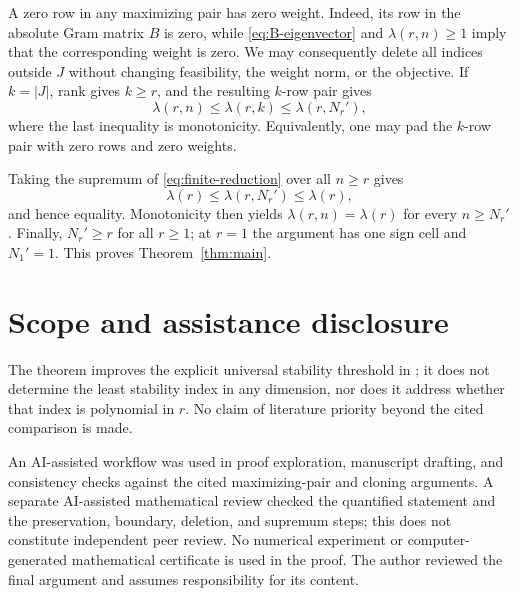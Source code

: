 \documentclass[11pt]{article}
\begin{document}
A zero row in any maximizing pair has zero weight.  Indeed, its row in the
absolute Gram matrix $B$ is zero, while
\eqref{eq:B-eigenvector} and $\lambda(r,n)\ge1$ imply that the corresponding
weight is zero.  We may consequently delete all indices outside $J$ without
changing feasibility, the weight norm, or the objective.  If $k=|J|$, rank
gives $k\ge r$, and the resulting $k$-row pair gives
\begin{equation}\label{eq:finite-reduction}
 \lambda(r,n)\le\lambda(r,k)\le\lambda(r,N_r'),
\end{equation}
where the last inequality is monotonicity.  Equivalently, one may pad the
$k$-row pair with zero rows and zero weights.

Taking the supremum of \eqref{eq:finite-reduction} over all $n\ge r$ gives
\[
 \lambda(r)\le\lambda(r,N_r')\le\lambda(r),
\]
and hence equality.  Monotonicity then yields
$\lambda(r,n)=\lambda(r)$ for every $n\ge N_r'$.  Finally,
$N_r'\ge r$ for all $r\ge1$; at $r=1$ the argument has one sign cell and
$N_1'=1$.  This proves Theorem~\ref{thm:main}.

\section*{Scope and assistance disclosure}

The theorem improves the explicit universal stability threshold in
\cite{KumarEtAl2026}; it does not determine the least stability index in any
dimension, nor does it address whether that index is polynomial in $r$.
No claim of literature priority beyond the cited comparison is made.

An AI-assisted workflow was used in proof exploration, manuscript drafting,
and consistency checks against the cited maximizing-pair and cloning
arguments.  A separate AI-assisted mathematical review checked the quantified
statement and the preservation, boundary, deletion, and supremum steps; this
does not constitute independent peer review.  No numerical experiment or
computer-generated mathematical certificate is used in the proof.  The author
reviewed the final argument and assumes responsibility for its content.



\end{document}
